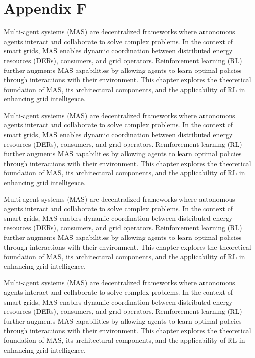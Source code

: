 \chapter*{Appendix F}


Multi-agent systems (MAS) are decentralized frameworks where autonomous agents interact and collaborate to solve complex problems. 
In the context of smart grids, MAS enables dynamic coordination between distributed energy resources (DERs), consumers, and grid operators. 
Reinforcement learning (RL) further augments MAS capabilities by allowing agents to learn optimal policies through interactions with their environment. 
This chapter explores the theoretical foundation of MAS, its architectural components, and the applicability of RL in enhancing grid intelligence.

Multi-agent systems (MAS) are decentralized frameworks where autonomous agents interact and collaborate to solve complex problems. 
In the context of smart grids, MAS enables dynamic coordination between distributed energy resources (DERs), consumers, and grid operators. 
Reinforcement learning (RL) further augments MAS capabilities by allowing agents to learn optimal policies through interactions with their environment. 
This chapter explores the theoretical foundation of MAS, its architectural components, and the applicability of RL in enhancing grid intelligence.

Multi-agent systems (MAS) are decentralized frameworks where autonomous agents interact and collaborate to solve complex problems. 
In the context of smart grids, MAS enables dynamic coordination between distributed energy resources (DERs), consumers, and grid operators. 
Reinforcement learning (RL) further augments MAS capabilities by allowing agents to learn optimal policies through interactions with their environment. 
This chapter explores the theoretical foundation of MAS, its architectural components, and the applicability of RL in enhancing grid intelligence.

Multi-agent systems (MAS) are decentralized frameworks where autonomous agents interact and collaborate to solve complex problems. 
In the context of smart grids, MAS enables dynamic coordination between distributed energy resources (DERs), consumers, and grid operators. 
Reinforcement learning (RL) further augments MAS capabilities by allowing agents to learn optimal policies through interactions with their environment. 
This chapter explores the theoretical foundation of MAS, its architectural components, and the applicability of RL in enhancing grid intelligence.


